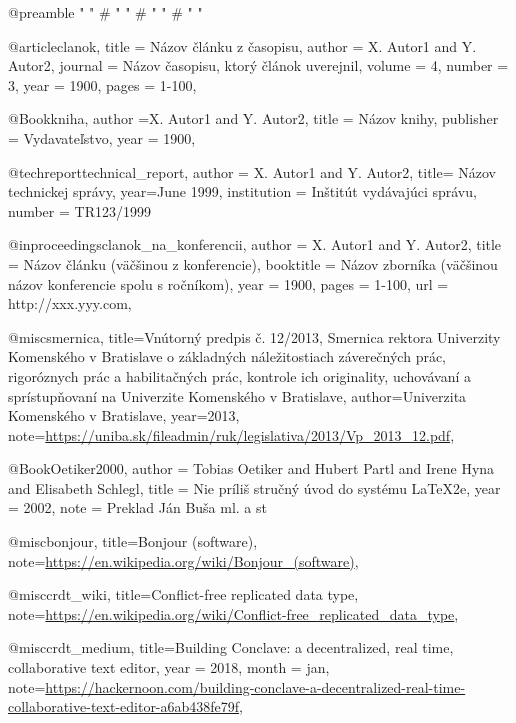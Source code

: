 @preamble{ "\newcommand{\noopsort}[1]{} "
	# "\newcommand{\printfirst}[2]{#1} "
	# "\newcommand{\singleletter}[1]{#1} "
	# "\newcommand{\switchargs}[2]{#2#1} " }

@article{clanok,
    title = 	{Názov článku z časopisu},
    author =	{X. Autor1 and Y. Autor2},
    journal = {Názov časopisu, ktorý článok uverejnil},
    volume = {4},
    number = {3},
    year = {1900},
    pages = {1-100},
}

@Book{kniha,
    author ={X. Autor1 and Y. Autor2},
    title =        {Názov knihy},
    publisher =    {Vydavateľstvo},
    year =         {1900},
}


@techreport{technical_report,
    author =	{X. Autor1 and Y. Autor2},
    title= {Názov technickej správy},
    year={June 1999},
    institution = {Inštitút vydávajúci správu},
    number = {TR123/1999}
}

@inproceedings{clanok_na_konferencii,
    author =	{X. Autor1 and Y. Autor2},
    title = {Názov článku (väčšinou z konferencie)},
    booktitle = {Názov zborníka (väčšinou názov konferencie spolu s ročníkom)},
    year = {1900},
    pages = {1-100},
    url = {http://xxx.yyy.com},
}    
  
@misc{smernica,
 title={Vnútorný predpis č. 12/2013,
Smernica rektora {U}niverzity {K}omenského v {B}ratislave
o základných náležitostiach záverečných prác, rigoróznych 
prác a habilitačných prác, kontrole ich  originality, 
uchovávaní a sprístupňovaní  na {U}niverzite {K}omenského v {B}ratislave},
 author={{Univerzita Komenského v Bratislave}},
 year={2013},
 note={\url{https://uniba.sk/fileadmin/ruk/legislativa/2013/Vp_2013_12.pdf}},
}

@Book{Oetiker2000,
  author = 	 {Tobias Oetiker and Hubert Partl and Irene Hyna and Elisabeth Schlegl},
  title = 	 {Nie príliš stručný úvod do systému LaTeX2e},
  year = 	 {2002},
  note = {Preklad Ján Buša ml. a st}
}

@misc{bonjour,
 title={Bonjour (software)},
 note={\url{https://en.wikipedia.org/wiki/Bonjour_(software)}},
}

@misc{crdt_wiki,
 title={Conflict-free replicated data type},
 note={\url{https://en.wikipedia.org/wiki/Conflict-free_replicated_data_type}},
}

@misc{crdt_medium,
 title={Building Conclave: a decentralized, real time, collaborative text editor},
 year = {2018},
 month = jan,
 note={\url{https://hackernoon.com/building-conclave-a-decentralized-real-time-collaborative-text-editor-a6ab438fe79f}},
}

